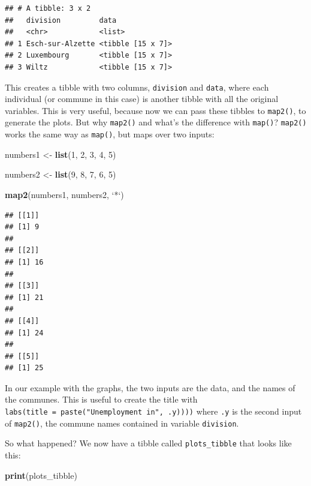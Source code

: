 \documentclass[]{gitbook}
\newenvironment{Shaded}{\begin{snugshade}}{\end{snugshade}}
\newcommand{\DataTypeTok}[1]{\textcolor[rgb]{0.13,0.29,0.53}{#1}}
\newcommand{\DecValTok}[1]{\textcolor[rgb]{0.00,0.00,0.81}{#1}}
\newcommand{\KeywordTok}[1]{\textcolor[rgb]{0.13,0.29,0.53}{\textbf{#1}}}
\newcommand{\NormalTok}[1]{#1}
\newcommand{\StringTok}[1]{\textcolor[rgb]{0.31,0.60,0.02}{#1}}
\theoremstyle{definition}
\theoremstyle{definition}
\theoremstyle{definition}
\theoremstyle{remark}
\begin{document}
\begin{verbatim}
## # A tibble: 3 x 2
##   division         data             
##   <chr>            <list>           
## 1 Esch-sur-Alzette <tibble [15 x 7]>
## 2 Luxembourg       <tibble [15 x 7]>
## 3 Wiltz            <tibble [15 x 7]>
\end{verbatim}

This creates a tibble with two columns, \texttt{division} and
\texttt{data}, where each individual (or commune in this case) is
another tibble with all the original variables. This is very useful,
because now we can pass these tibbles to \texttt{map2()}, to generate
the plots. But why \texttt{map2()} and what's the difference with
\texttt{map()}? \texttt{map2()} works the same way as \texttt{map()},
but maps over two inputs:

\begin{Shaded}
\begin{Highlighting}[]
\NormalTok{numbers1 <-}\StringTok{ }\KeywordTok{list}\NormalTok{(}\DecValTok{1}\NormalTok{, }\DecValTok{2}\NormalTok{, }\DecValTok{3}\NormalTok{, }\DecValTok{4}\NormalTok{, }\DecValTok{5}\NormalTok{)}

\NormalTok{numbers2 <-}\StringTok{ }\KeywordTok{list}\NormalTok{(}\DecValTok{9}\NormalTok{, }\DecValTok{8}\NormalTok{, }\DecValTok{7}\NormalTok{, }\DecValTok{6}\NormalTok{, }\DecValTok{5}\NormalTok{)}

\KeywordTok{map2}\NormalTok{(numbers1, numbers2, }\StringTok{`}\DataTypeTok{*}\StringTok{`}\NormalTok{)}
\end{Highlighting}
\end{Shaded}

\begin{verbatim}
## [[1]]
## [1] 9
## 
## [[2]]
## [1] 16
## 
## [[3]]
## [1] 21
## 
## [[4]]
## [1] 24
## 
## [[5]]
## [1] 25
\end{verbatim}

In our example with the graphs, the two inputs are the data, and the
names of the communes. This is useful to create the title with
\texttt{labs(title\ =\ paste("Unemployment\ in",\ .y))))} where
\texttt{.y} is the second input of \texttt{map2()}, the commune names
contained in variable \texttt{division}.

So what happened? We now have a tibble called \texttt{plots\_tibble}
that looks like this:

\begin{Shaded}
\begin{Highlighting}[]
\KeywordTok{print}\NormalTok{(plots_tibble)}
\end{Highlighting}
\end{Shaded}
\end{document}
